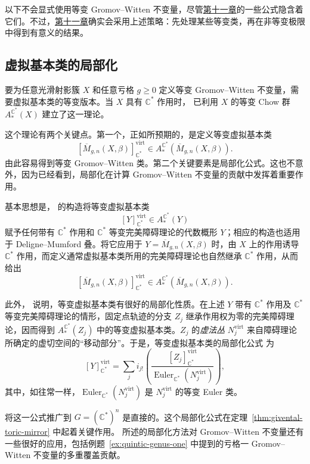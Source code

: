 以下不会显式使用等变 Gromov--Witten 不变量，尽管\hyperref[chap:mirror-theorem]{第十一章}的一些公式隐含着它们。不过，\hyperref[chap:mirror-theorem]{第十一章}确实会采用上述策略：先处理某些等变类，再在非等变极限中得到有意义的结果。

\subsection{虚拟基本类的局部化}\label{subsec:virtual-localization}
要为任意光滑射影簇 $X$ 和任意亏格 $g\ge0$ 定义等变 Gromov--Witten 不变量，需要虚拟基本类的等变版本。当 $X$ 具有 $\mathbb C^*$ 作用时， 已利用 $X$ 的等变 Chow 群 $A_*^{\mathbb C^*}(X)$ 建立了这一理论。

这个理论有两个关键点。第一个，正如所预期的，是定义等变虚拟基本类
\[
[\overline M_{g,n}(X,\beta)]_{\mathbb C^*}^{\mathrm{virt}}
\in A_*^{\mathbb C^*}(\overline M_{g,n}(X,\beta)).
\]
由此容易得到等变 Gromov--Witten 类。第二个关键要素是局部化公式。这也不意外，因为已经看到，局部化在计算 Gromov--Witten 不变量的贡献中发挥着重要作用。

基本思想是， 的构造将等变虚拟基本类
\[
[Y]_{\mathbb C^*}^{\mathrm{virt}}\in A_*^{\mathbb C^*}(Y)
\]
赋予任何带有 $\mathbb C^*$ 作用和 $\mathbb C^*$ 等变完美障碍理论的代数概形 $Y$；相应的构造也适用于 Deligne--Mumford 叠。将它应用于 $Y=\overline M_{g,n}(X,\beta)$ 时，由 $X$ 上的作用诱导 $\mathbb C^*$ 作用，而定义通常虚拟基本类所用的完美障碍理论也自然继承 $\mathbb C^*$ 作用，从而给出
\[
[\overline M_{g,n}(X,\beta)]_{\mathbb C^*}^{\mathrm{virt}}
\in A_*^{\mathbb C^*}(\overline M_{g,n}(X,\beta)).
\]

此外， 说明，等变虚拟基本类有很好的局部化性质。在上述 $Y$ 带有 $\mathbb C^*$ 作用及 $\mathbb C^*$ 等变完美障碍理论的情形，固定点轨迹的分支 $Z_j$ 继承作用权为零的完美障碍理论，因而得到 $A_*^{\mathbb C^*}(Z_j)$
中的等变虚拟基本类。$Z_j$ 的\emph{虚法丛} $N_j^{\mathrm{virt}}$ 来自障碍理论所确定的虚切空间的“移动部分”。于是，等变虚拟基本类的局部化公式  为
\[
[Y]_{\mathbb C^*}^{\mathrm{virt}}
=\sum_j i_{j!}\left(\frac{[Z_j]_{\mathbb C^*}^{\mathrm{virt}}}
{\operatorname{Euler}_{\mathbb C^*}(N_j^{\mathrm{virt}})}\right),
\]
其中，如往常一样，$\operatorname{Euler}_{\mathbb C^*}(N_j^{\mathrm{virt}})$ 是 $N_j^{\mathrm{virt}}$ 的等变 Euler 类。

将这一公式推广到 $G=(\mathbb C^*)^n$ 是直接的。这个局部化公式在定理~\ref{thm:givental-toric-mirror} 中起着关键作用。 所述的局部化方法对 Gromov--Witten 不变量还有一些很好的应用，包括例题~\ref{ex:quintic-genus-one} 中提到的亏格一 Gromov--Witten 不变量的多重覆盖贡献。
